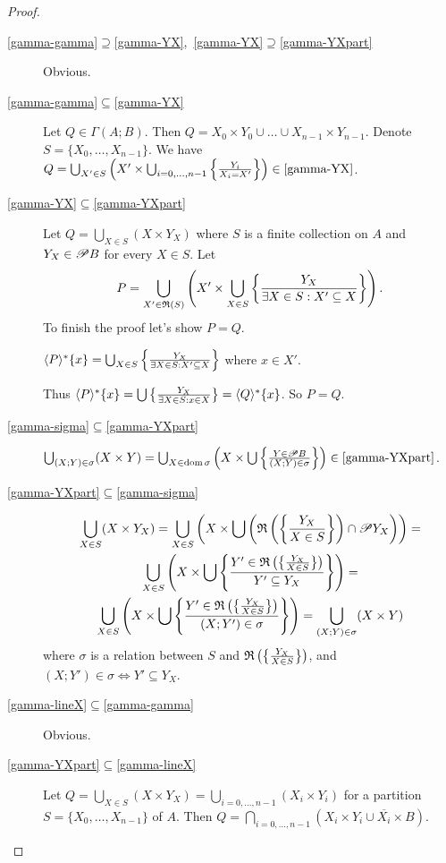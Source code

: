 \begin{proof}
~
\begin{description}
\item [{\ref{gamma-gamma}$\supseteq$\ref{gamma-YX},~\ref{gamma-YX}$\supseteq$\ref{gamma-YXpart}}] Obvious.
\item [{\ref{gamma-gamma}$\subseteq$\ref{gamma-YX}}] Let $Q\in\Gamma(A;B)$.
Then $Q=X_{0}\times Y_{0}\cup\ldots\cup X_{n-1}\times Y_{n-1}$. Denote
$S=\{X_{0},\ldots,X_{n-1}\}$. We have $Q=\bigcup_{X'\in S}\left(X'\times\bigcup_{i=0,\dots,n-1}\left\{ \frac{Y_{i}}{X_{i}=X'}\right\}\right)\in\text{\ref{gamma-YX}}$.
\item [{\ref{gamma-YX}$\subseteq$\ref{gamma-YXpart}}] Let $Q=\bigcup_{X\in S}(X\times Y_{X})$
where $S$ is a finite collection on $A$ and $Y_{X}\in\mathscr{P} B$
for every $X\in S$. Let 
\[
P=\bigcup_{X'\in\mathfrak{R}(S)}\left(X'\times\bigcup_{X\in S}\left\{ \frac{Y_{X}}{\exists X\in S:X'\subseteq X}\right\}\right).
\]
To finish the proof let's show $P=Q$.


$\langle P\rangle^{\ast}\{x\}=\bigcup_{X\in S}\left\{ \frac{Y_{X}}{\exists X\in S:X'\subseteq X}\right\}$
where $x\in X'$.


Thus $\langle P\rangle^{\ast}\{x\}=\bigcup\left\{ \frac{Y_{X}}{\exists X\in S:x\in X}\right\}=\langle Q\rangle^{\ast}\{x\}$.
So $P=Q$.

\item [{\ref{gamma-sigma}$\subseteq$\ref{gamma-YXpart}}] $\bigcup_{(X;Y)\in\sigma}(X\times Y)=\bigcup_{X\in\operatorname{dom}\sigma}\left(X\times\bigcup\left\{ \frac{Y\in\mathscr{P} B}{(X;Y)\in\sigma}\right\}\right)\in\text{\text{\ref{gamma-YXpart}}}$.
\item [{\ref{gamma-YXpart}$\subseteq$\ref{gamma-sigma}}] 
\begin{multline*}
\bigcup_{X\in S}(X\times Y_{X})=\bigcup_{X\in S}\left(X\times\bigcup\left(\mathfrak{R}\left(\left\{ \frac{Y_{X}}{X\in S}\right\}\right)\cap\mathscr{P} Y_{X}\right)\right)=\\
\bigcup_{X\in S}\left(X\times\bigcup\left\{ \frac{Y'\in\mathfrak{R}\left(\left\{ \frac{Y_{X}}{X\in S}\right\}\right)}{Y'\subseteq Y_{X}}\right\}\right)=\\
\bigcup_{X\in S}\left(X\times\bigcup\left\{ \frac{Y'\in\mathfrak{R}\left(\left\{ \frac{Y_{X}}{X\in S}\right\}\right)}{(X;Y')\in\sigma}\right\}\right)=\bigcup_{(X;Y)\in\sigma}(X\times Y)
\end{multline*}
 where $\sigma$ is a relation between $S$ and $\mathfrak{R}\left(\left\{ \frac{Y_{X}}{X\in S}\right\}\right)$,
and $(X;Y')\in\sigma\Leftrightarrow Y'\subseteq Y_{X}$.
\item [{\ref{gamma-lineX}$\subseteq$\ref{gamma-gamma}}] Obvious.
\item [{\ref{gamma-YXpart}$\subseteq$\ref{gamma-lineX}}] Let $Q=\bigcup_{X\in S}(X\times Y_{X})=\bigcup_{i=0,\ldots,n-1}(X_{i}\times Y_{i})$
for a partition $S=\{X_{0},\ldots,X_{n-1}\}$ of $A$. Then $Q=\bigcap_{i=0,\ldots,n-1}\left(X_{i}\times Y_{i}\cup\overline{X_{i}}\times B\right)$.
\end{description}
\end{proof}
